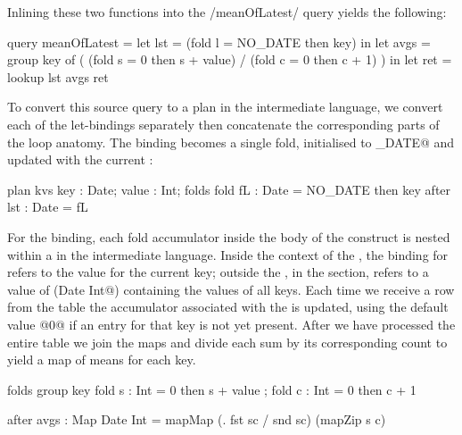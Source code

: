 

Inlining these two functions into the \Hs/meanOfLatest/ query yields the following:
\begin{icicle}
query meanOfLatest
 = let lst  = (fold l = NO_DATE then key) in
   let avgs = group key of
              ( (fold s = 0 then s + value)
              / (fold c = 0 then c + 1) ) in
   let ret  = lookup lst avgs
   ret
\end{icicle}

To convert this source query to a plan in the intermediate language, we convert each of the let-bindings separately then concatenate the corresponding parts of the loop anatomy.
The \IcC@lst@ binding becomes a single fold, initialised to \IcC@NO_DATE@ and updated with the current \IcC@key@:
\begin{icicle-core}
plan kvs {      key : Date; value : Int;       }
folds    { fold fL  : Date = NO_DATE then key  }
after    {      lst : Date = fL                }
\end{icicle-core}

For the \IcC@avgs@ binding, each fold accumulator inside the body of the \IcC@group@ construct is nested within a \IcC@group@ in the intermediate language.
Inside the context of the \IcC@group@, the binding for \IcC@s@ refers to the \IcC@Int@ value for the current key; outside the \IcC@group@, in the \IcC@after@ section, \IcC@s@ refers to a value of (\IcC@Map Date Int@) containing the values of all keys.
Each time we receive a row from the table the accumulator associated with the \IcC@key@ is updated, using the default value @0@ if an entry for that key is not yet present.
After we have processed the entire table we join the maps and divide each sum by its corresponding count to yield a map of means for each key.
\begin{icicle-core}
folds  { group key
          { fold s : Int = 0 then s + value
          ; fold c : Int = 0 then c + 1 } }

after  { avgs : Map Date Int
          = mapMap (\sc. fst sc / snd sc) (mapZip s c) }
\end{icicle-core}


